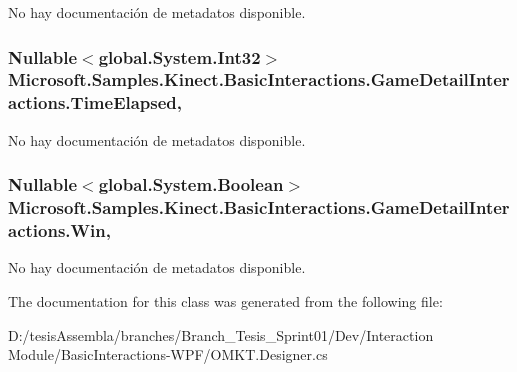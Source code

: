 No hay documentación de metadatos disponible. 

\hypertarget{class_microsoft_1_1_samples_1_1_kinect_1_1_basic_interactions_1_1_game_detail_interactions_ae4760b77d43df6fc4b45615efbcc9425}{
\subsubsection[{Time\-Elapsed}]{\setlength{\rightskip}{0pt plus 5cm}Nullable$<$global.\-System.\-Int32$>$ Microsoft.\-Samples.\-Kinect.\-Basic\-Interactions.\-Game\-Detail\-Interactions.\-Time\-Elapsed\hspace{0.3cm}{\ttfamily [get]}, {\ttfamily [set]}}}\label{class_microsoft_1_1_samples_1_1_kinect_1_1_basic_interactions_1_1_game_detail_interactions_ae4760b77d43df6fc4b45615efbcc9425}


No hay documentación de metadatos disponible. 

\hypertarget{class_microsoft_1_1_samples_1_1_kinect_1_1_basic_interactions_1_1_game_detail_interactions_a11f4d18a314835a8196d1d6a468f290b}{
\subsubsection[{Win}]{\setlength{\rightskip}{0pt plus 5cm}Nullable$<$global.\-System.\-Boolean$>$ Microsoft.\-Samples.\-Kinect.\-Basic\-Interactions.\-Game\-Detail\-Interactions.\-Win\hspace{0.3cm}{\ttfamily [get]}, {\ttfamily [set]}}}\label{class_microsoft_1_1_samples_1_1_kinect_1_1_basic_interactions_1_1_game_detail_interactions_a11f4d18a314835a8196d1d6a468f290b}


No hay documentación de metadatos disponible. 



The documentation for this class was generated from the following file\-:\begin{DoxyCompactItemize}
\item 
D\-:/tesis\-Assembla/branches/\-Branch\-\_\-\-Tesis\-\_\-\-Sprint01/\-Dev/\-Interaction Module/\-Basic\-Interactions-\/\-W\-P\-F/O\-M\-K\-T.\-Designer.\-cs\end{DoxyCompactItemize}
